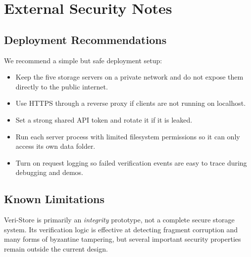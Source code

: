 \documentclass[../veristore_security_model.tex]{subfiles}
\begin{document}
\section{External Security Notes}


\subsection{Deployment Recommendations}

We recommend a simple but safe deployment setup:
\begin{itemize}
    \item Keep the five storage servers on a private network and do not expose them directly to the public internet.
    \item Use HTTPS through a reverse proxy if clients are not running on localhost.
    \item Set a strong shared API token and rotate it if it is leaked.
    \item Run each server process with limited filesystem permissions so it can only access its own data folder.
    \item Turn on request logging so failed verification events are easy to trace during debugging and demos.
\end{itemize}

\subsection{Known Limitations}

Veri-Store is primarily an \emph{integrity} prototype, not a complete secure storage system. Its verification logic is effective at detecting fragment corruption and many forms of byzantine tampering, but several important security properties remain outside the current design.
\end{document}
